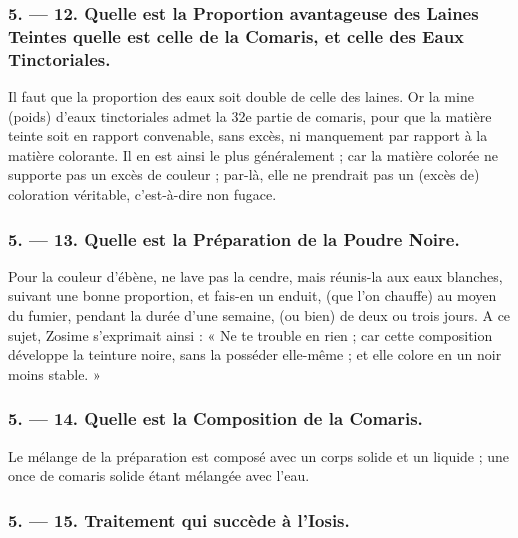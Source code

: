\documentclass[a4paper, 11pt, oneside, polutonikogreek, french]{article}
\begin{document}
\bigskip
\centerline{\EightStarTaper}
\centerline{\EightStarTaper\EightStarTaper}
\bigskip

\subsubsection{5. --- 12. Quelle est la Proportion avantageuse des Laines Teintes quelle est celle de la Comaris, et celle des Eaux Tinctoriales.}

Il faut que la proportion des eaux soit double de celle des laines. Or la mine (poids) d'eaux tinctoriales admet la 32e partie de comaris, pour que la matière teinte soit en rapport convenable, sans excès, ni manquement par rapport à la matière colorante. Il en est ainsi le plus généralement ; car la matière colorée ne supporte pas un excès de couleur ; par-là, elle ne prendrait pas un (excès de) coloration véritable, c'est-à-dire non fugace.

\bigskip
\centerline{\EightStarTaper}
\centerline{\EightStarTaper\EightStarTaper}
\bigskip

\subsubsection{5. --- 13. Quelle est la Préparation de la Poudre Noire.}

Pour la couleur d'ébène, ne lave pas la cendre, mais réunis-la aux eaux blanches, suivant une bonne proportion, et fais-en un enduit, (que l'on chauffe) au moyen du fumier, pendant la durée d'une semaine, (ou bien) de deux ou trois jours. A ce sujet, Zosime s'exprimait ainsi : « Ne te trouble en rien ; car cette composition développe la teinture noire, sans la posséder elle-même ; et elle colore en un noir moins stable. »

\bigskip
\centerline{\EightStarTaper}
\centerline{\EightStarTaper\EightStarTaper}
\bigskip

\subsubsection{5. --- 14. Quelle est la Composition de la Comaris.}

Le mélange de la préparation est composé avec un corps solide et un liquide ; une once de comaris solide étant mélangée avec l'eau.

\bigskip
\centerline{\EightStarTaper}
\centerline{\EightStarTaper\EightStarTaper}
\bigskip

\subsubsection{5. --- 15. Traitement qui succède à l'Iosis.}
\end{document}
